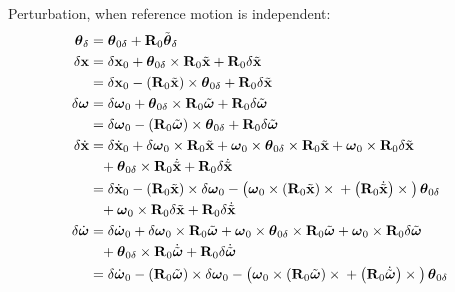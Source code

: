 \documentclass[10pt,dvips,fleqn,subeqn]{report}
\newcommand{\T}[1]{\bm{\mathbf{#1}}}
\newcommand{\TT}[1]{\bm{\mathbf{#1}}}
\begin{document}
Perturbation, when reference motion is independent:
\begin{subequations}
\begin{align}
	\T{\theta}_{\delta}
		&= \T{\theta}_{0\delta}
	+ \TT{R}_0 \tilde{\T{\theta}}_{\delta} \\
	\delta\T{x}
		&= \delta\T{x}_0
		+ \T{\theta}_{0\delta}\times\TT{R}_0 \tilde{\T{x}}
		+ \TT{R}_0 \delta\tilde{\T{x}}
		\nonumber \\
		&= \delta\T{x}_0
		- \plbr{\TT{R}_0 \tilde{\T{x}}} \times \T{\theta}_{0\delta}
		+ \TT{R}_0 \delta\tilde{\T{x}} \\
	\delta \T{\omega}
		&= \delta\T{\omega}_0
		+ \T{\theta}_{0\delta}\times\TT{R}_0 \tilde{\T{\omega}}
		+ \TT{R}_0 \delta\tilde{\T{\omega}}
		\nonumber \\
		&= \delta\T{\omega}_0
		- \plbr{\TT{R}_0 \tilde{\T{\omega}}} \times \T{\theta}_{0\delta}
		+ \TT{R}_0 \delta\tilde{\T{\omega}} \\
	\delta\dot{\T{x}}
		&= \delta\dot{\T{x}}_0
		+ \delta\T{\omega}_0 \times \TT{R}_0 \tilde{\T{x}}
		+ \T{\omega}_0 \times \T{\theta}_{0\delta}\times\TT{R}_0 \tilde{\T{x}}
		+ \T{\omega}_0 \times \TT{R}_0 \delta\tilde{\T{x}}
		\nonumber \\
		&\hphantom{=}+ \T{\theta}_{0\delta}\times\TT{R}_0 \dot{\tilde{\T{x}}}
		+ \TT{R}_0 \delta\dot{\tilde{\T{x}}}
		\nonumber \\
		&= \delta\dot{\T{x}}_0
		- \plbr{\TT{R}_0 \tilde{\T{x}}} \times \delta\T{\omega}_0
		- \plbr{
			\T{\omega}_0 \times \plbr{\TT{R}_0 \tilde{\T{x}}} \times{}
			+ \plbr{\TT{R}_0 \dot{\tilde{\T{x}}}}\times{}
		}\T{\theta}_{0\delta}
		\nonumber \\
		&\hphantom{=}+ \T{\omega}_0 \times \TT{R}_0 \delta\tilde{\T{x}}
		+ \TT{R}_0 \delta\dot{\tilde{\T{x}}} \\
	\delta\dot{\T{\omega}}
		&= \delta\dot{\T{\omega}}_0
		+ \delta\T{\omega}_0 \times \TT{R}_0 \tilde{\T{\omega}}
		+ \T{\omega}_0 \times \T{\theta}_{0\delta}\times\TT{R}_0 \tilde{\T{\omega}}
		+ \T{\omega}_0 \times \TT{R}_0 \delta\tilde{\T{\omega}}
		\nonumber \\
		&\hphantom{=}+ \T{\theta}_{0\delta}\times\TT{R}_0 \dot{\tilde{\T{\omega}}}
		+ \TT{R}_0 \delta\dot{\tilde{\T{\omega}}}
		\nonumber \\
		&= \delta\dot{\T{\omega}}_0
		- \plbr{\TT{R}_0 \tilde{\T{\omega}}} \times \delta\T{\omega}_0
		- \plbr{
			\T{\omega}_0 \times \plbr{\TT{R}_0 \tilde{\T{\omega}}}\times{}
			+ \plbr{\TT{R}_0 \dot{\tilde{\T{\omega}}}}\times{}
		}\T{\theta}_{0\delta}

\end{align}
\end{subequations}
\end{document}
